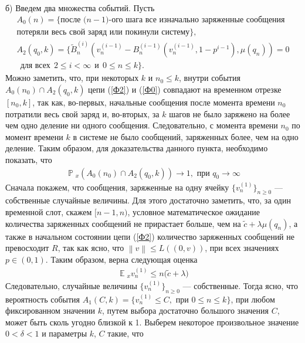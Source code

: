 \documentclass[10pt, reqno]{amsart}
\newcommand{\norm}[1]{\left\lVert#1\right\rVert}
\DeclareMathOperator*{\E}{\mathbb{E}}
\DeclareMathOperator*{\Pb}{\mathbb{P}}
\begin{document}
$ $
\\
б) Введем два множества событий. Пусть
\begin{gather*}
    A_{0}(n) = \{\text{после ($n-1$)-ого шага все изначально заряженные сообщения}\\ \text{потеряли весь свой заряд или покинули систему}\},\\
    A_{2}(q_{0}, k) = \{\widetilde{B}^{(i)}_{n}(v^{(i-1)}_{n} - B^{(i-1)}_{n}(v^{(i-1)}_{n}, 1 - p^{i-1}), \mu(q_{n})) = 0 \\\:\:\text{для всех} \:\: 2 \leq i < \infty \:\: \text{и} \:\: 0 \leq n \leq k\}.
\end{gather*}
Можно заметить, что, при некоторых $k$ и $n_{0} \leq k$, внутри события $A_{0}(n_{0}) \cap A_{2}(q_{0}, k)$ цепи (\ref{Ф2}) и (\ref{Ф0}) совпадают на временном отрезке $[n_{0}, k]$, так как, во-первых, начальные сообщения после момента времени $n_{0}$ потратили весь свой заряд и, во-вторых, за $k$ шагов не было заряжено на более чем одно деление ни одного сообщения. Следовательно, с момента времени $n_{0}$ по момент времени $k$ в системе не было сообщений, заряженных более, чем на одно деление. Таким образом, для доказательства данного пункта, необходимо показать, что
\begin{align}
    \Pb{}_{x}(A_{0}(n_{0}) \cap A_{2}(q_{0}, k)) \xrightarrow{} 1, \text{ при } q_{0} \xrightarrow{} \infty
    \label{Merging_chains}
\end{align}
Сначала покажем, что сообщения, заряженные на одну ячейку $\{v^{(1)}_{n}\}_{n \geq 0}$ --- собственные случайные величины. Для этого достаточно заметить, что, за один временной слот, скажем $[n-1, n)$, условное математическое ожидание количества заряженных сообщений не прирастает больше, чем на $\widetilde{c} + \lambda\mu(q_{n})$, а также в начальном состоянии цепи (\ref{Ф2}) количество заряженных сообщений не превосходит $R$, так как ясно, что $\norm{v} \leq L((0, v))$, при всех значениях $p \in (0, 1)$. Таким образом, верна следующая оценка
\begin{align*}
    \E{}_{x}v_{n}^{(1)} \leq n\big(\widetilde{c} + \lambda\big)
    \label{Expectation_vn_simple_estimation}
\end{align*}
Следовательно, случайные величины $\{v_{n}^{(1)}\}_{n \geq 0}$ --- собственные. Тогда ясно, что вероятность события $A_{1}(C, k) = \{v_{n}^{(1)} \leq C, \text{ при } 0 \leq n \leq k\}$, при любом фиксированном значении $k$, путем выбора достаточно большого значения $C$, может быть сколь угодно близкой к 1. Выберем некоторое произвольное значение $0 < \delta < 1$ и параметры $k$, $C$ такие, что
\end{document}
